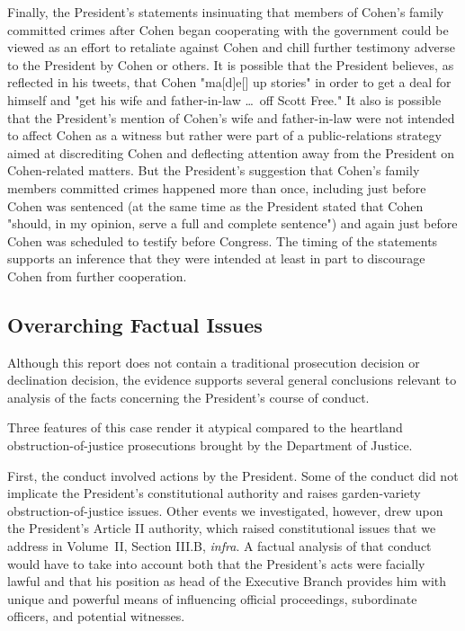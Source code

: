 Finally, the President's statements insinuating that members of Cohen's family committed crimes after Cohen began cooperating with the government could be viewed as an effort to retaliate against Cohen and chill further testimony adverse to the President by Cohen or others.
It is possible that the President believes, as reflected in his tweets, that Cohen "ma[d]e[] up stories" in order to get a deal for himself and "get his wife and father-in-law \dots\ off Scott Free." It also is possible that the President's mention of Cohen's wife and father-in-law were not intended to affect Cohen as a witness but rather were part of a public-relations strategy aimed at discrediting Cohen and deflecting attention away from the President on Cohen-related matters.
But the President's suggestion that Cohen's family members committed crimes happened more than once, including just before Cohen was sentenced (at the same time as the President stated that Cohen "should, in my opinion, serve a full and complete sentence") and again just before Cohen was scheduled to testify before Congress.
The timing of the statements supports an inference that they were intended at least in part to discourage Cohen from further cooperation.

\subsection{Overarching Factual Issues}

Although this report does not contain a traditional prosecution decision or declination decision, the evidence supports several general conclusions relevant to analysis of the facts concerning the President's course of conduct.

Three features of this case render it atypical compared to the heartland obstruction-of-justice prosecutions brought by the Department of Justice.

First, the conduct involved actions by the President.
Some of the conduct did not implicate the President's constitutional authority and raises garden-variety obstruction-of-justice issues.
Other events we investigated, however, drew upon the President's Article II authority, which raised constitutional issues that we address in Volume~II, Section III.B, \textit{infra}.
A factual analysis of that conduct would have to take into account both that the President's acts were facially lawful and that his position as head of the Executive Branch provides him with unique and powerful means of influencing official proceedings, subordinate officers, and potential witnesses.

